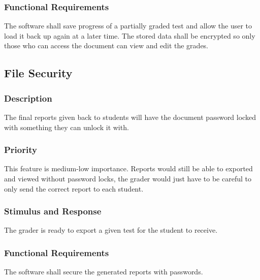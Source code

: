 \subsubsection{Functional Requirements}
The software shall save progress of a partially graded test and allow the user to load it back up again at a later time. The stored data shall be encrypted so only those who can access the document can view and edit the grades.


\subsection{File Security}
\subsubsection{Description}
The final reports given back to students will have the document password locked with something they can unlock it with.

\subsubsection{Priority}
This feature is medium-low importance. Reports would still be able to exported and viewed without password locks, the grader would just have to be careful to only send the correct report to each student.

\subsubsection{Stimulus and Response}
The grader is ready to export a given test for the student to receive.

\subsubsection{Functional Requirements}
The software shall secure the generated reports with passwords.

